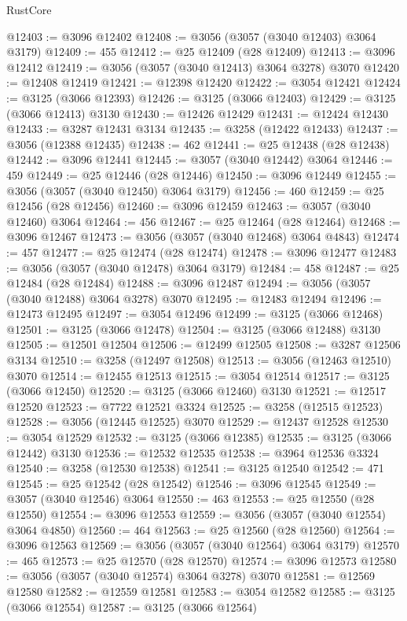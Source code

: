 \begin{lexlean}{RustCore}
\begin{coremodule}
@12403 := @3096 @12402
@12408 := @3056 (@3057 (@3040 @12403) @3064 @3179)
@12409 := 455
@12412 := @25 @12409 (@28 @12409)
@12413 := @3096 @12412
@12419 := @3056 (@3057 (@3040 @12413) @3064 @3278) @3070
@12420 := @12408 @12419
@12421 := @12398 @12420
@12422 := @3054 @12421
@12424 := @3125 (@3066 @12393)
@12426 := @3125 (@3066 @12403)
@12429 := @3125 (@3066 @12413) @3130
@12430 := @12426 @12429
@12431 := @12424 @12430
@12433 := @3287 @12431 @3134
@12435 := @3258 (@12422 @12433)
@12437 := @3056 (@12388 @12435)
@12438 := 462
@12441 := @25 @12438 (@28 @12438)
@12442 := @3096 @12441
@12445 := @3057 (@3040 @12442) @3064
@12446 := 459
@12449 := @25 @12446 (@28 @12446)
@12450 := @3096 @12449
@12455 := @3056 (@3057 (@3040 @12450) @3064 @3179)
@12456 := 460
@12459 := @25 @12456 (@28 @12456)
@12460 := @3096 @12459
@12463 := @3057 (@3040 @12460) @3064
@12464 := 456
@12467 := @25 @12464 (@28 @12464)
@12468 := @3096 @12467
@12473 := @3056 (@3057 (@3040 @12468) @3064 @4843)
@12474 := 457
@12477 := @25 @12474 (@28 @12474)
@12478 := @3096 @12477
@12483 := @3056 (@3057 (@3040 @12478) @3064 @3179)
@12484 := 458
@12487 := @25 @12484 (@28 @12484)
@12488 := @3096 @12487
@12494 := @3056 (@3057 (@3040 @12488) @3064 @3278) @3070
@12495 := @12483 @12494
@12496 := @12473 @12495
@12497 := @3054 @12496
@12499 := @3125 (@3066 @12468)
@12501 := @3125 (@3066 @12478)
@12504 := @3125 (@3066 @12488) @3130
@12505 := @12501 @12504
@12506 := @12499 @12505
@12508 := @3287 @12506 @3134
@12510 := @3258 (@12497 @12508)
@12513 := @3056 (@12463 @12510) @3070
@12514 := @12455 @12513
@12515 := @3054 @12514
@12517 := @3125 (@3066 @12450)
@12520 := @3125 (@3066 @12460) @3130
@12521 := @12517 @12520
@12523 := @7722 @12521 @3324
@12525 := @3258 (@12515 @12523)
@12528 := @3056 (@12445 @12525) @3070
@12529 := @12437 @12528
@12530 := @3054 @12529
@12532 := @3125 (@3066 @12385)
@12535 := @3125 (@3066 @12442) @3130
@12536 := @12532 @12535
@12538 := @3964 @12536 @3324
@12540 := @3258 (@12530 @12538)
@12541 := @3125 @12540
@12542 := 471
@12545 := @25 @12542 (@28 @12542)
@12546 := @3096 @12545
@12549 := @3057 (@3040 @12546) @3064
@12550 := 463
@12553 := @25 @12550 (@28 @12550)
@12554 := @3096 @12553
@12559 := @3056 (@3057 (@3040 @12554) @3064 @4850)
@12560 := 464
@12563 := @25 @12560 (@28 @12560)
@12564 := @3096 @12563
@12569 := @3056 (@3057 (@3040 @12564) @3064 @3179)
@12570 := 465
@12573 := @25 @12570 (@28 @12570)
@12574 := @3096 @12573
@12580 := @3056 (@3057 (@3040 @12574) @3064 @3278) @3070
@12581 := @12569 @12580
@12582 := @12559 @12581
@12583 := @3054 @12582
@12585 := @3125 (@3066 @12554)
@12587 := @3125 (@3066 @12564)

\end{coremodule}
\end{lexlean}
